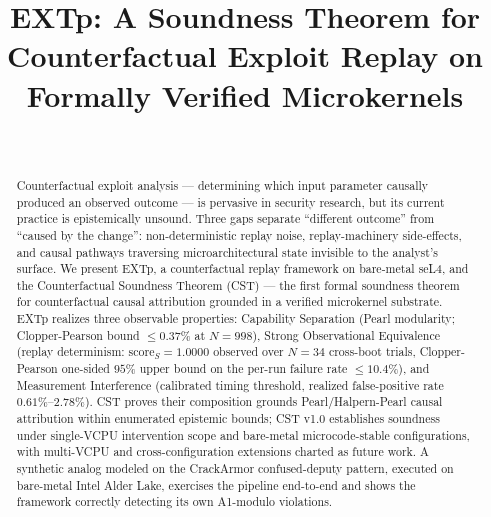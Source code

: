 \documentclass[conference]{IEEEtran}
\newcommand{\scoreS}{\text{score}_S}
\begin{document}
\title{EXTp: A Soundness Theorem for Counterfactual Exploit Replay on Formally Verified Microkernels}

\author{\\
}

\maketitle

\begin{abstract}
Counterfactual exploit analysis --- determining which input
parameter causally produced an observed outcome --- is pervasive
in security research, but its current practice is epistemically
unsound. Three gaps separate ``different outcome'' from ``caused
by the change'': non-deterministic replay noise, replay-machinery
side-effects, and causal pathways traversing microarchitectural
state invisible to the analyst's surface. We present EXTp, a
counterfactual replay framework on bare-metal seL4, and the
Counterfactual Soundness Theorem (CST) --- the first formal
soundness theorem for counterfactual causal attribution grounded
in a verified microkernel substrate. EXTp realizes three
observable properties: Capability
Separation (Pearl modularity; Clopper-Pearson bound
${\leq}0.37\%$ at $N{=}998$), Strong Observational Equivalence
(replay determinism: $\scoreS{=}1.0000$ observed over $N{=}34$
cross-boot trials, Clopper-Pearson one-sided $95\%$ upper bound on
the per-run failure rate ${\leq}10.4\%$), and Measurement
Interference (calibrated timing threshold,
realized false-positive rate $0.61\%$--$2.78\%$). CST proves their
composition grounds Pearl/Halpern-Pearl causal attribution within
enumerated epistemic bounds; CST v1.0 establishes soundness under
single-VCPU intervention scope and bare-metal microcode-stable
configurations, with multi-VCPU and cross-configuration extensions
charted as future work. A synthetic analog modeled on the
CrackArmor confused-deputy pattern, executed on bare-metal Intel
Alder Lake, exercises the pipeline end-to-end and shows the
framework correctly detecting its own A1-modulo violations.
\end{abstract}

\end{document}
